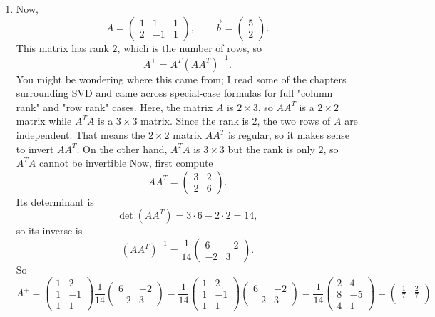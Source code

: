 \documentclass[10pt]{extarticle}
\begin{document}
\begin{enumerate}[label=(\alph*)]
\item Now,
\[
A=
\begin{pmatrix}
1 & 1 & 1\\
2 & -1 & 1
\end{pmatrix},
\qquad
\vec{b}=
\begin{pmatrix}
5\\2
\end{pmatrix}.
\]
This matrix has rank $2$, which is the number of rows, so
\[
A^+=A^T(AA^T)^{-1}.
\]
You might be wondering where this came from; I read some of the chapters surrounding SVD and came across special-case formulas for full "column rank" and "row rank" cases. Here, the matrix $A$ is $2\times 3$, so $AA^T$ is a $2\times 2$ matrix while $A^TA$ is a $3\times 3$ matrix. Since the rank is $2$, the two rows of $A$ are independent. That means the $2\times 2$ matrix $AA^T$ is regular, so it makes sense to invert $AA^T$. On the other hand, $A^TA$ is $3\times 3$ but the rank is only $2$, so $A^TA$ cannot be invertible Now, first compute
\[
AA^T=
\begin{pmatrix}
3 & 2\\
2 & 6
\end{pmatrix}.
\]
Its determinant is
\[
\det(AA^T)=3\cdot 6-2\cdot 2=14,
\]
so its inverse is
\[
(AA^T)^{-1}
=\frac{1}{14}
\begin{pmatrix}
6 & -2\\
-2 & 3
\end{pmatrix}.
\]
So
\[
A^+=
\begin{pmatrix}
1 & 2\\
1 & -1\\
1 & 1
\end{pmatrix}
\frac{1}{14}
\begin{pmatrix}
6 & -2\\
-2 & 3
\end{pmatrix}
=
\frac{1}{14}
\begin{pmatrix}
1 & 2\\
1 & -1\\
1 & 1
\end{pmatrix}
\begin{pmatrix}
6 & -2\\
-2 & 3
\end{pmatrix}
=
\frac{1}{14}
\begin{pmatrix}
2 & 4\\
8 & -5\\
4 & 1
\end{pmatrix}
=
\begin{pmatrix}
\frac{1}{7} & \frac{2}{7}\\[0.4em]

\end{pmatrix}\]
\end{enumerate}
\end{document}
